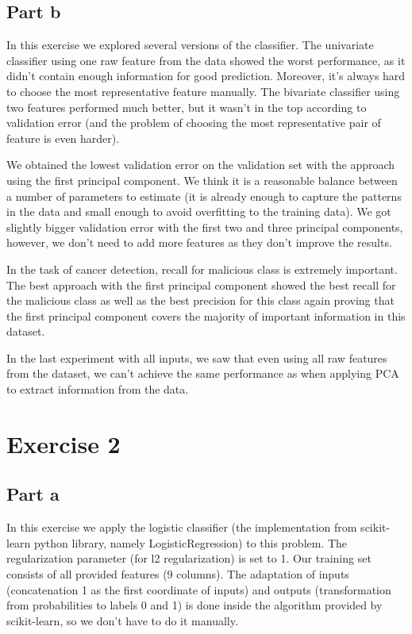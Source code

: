 \documentclass[11pt,a4paper]{article}
\begin{document}
\subsection*{Part b}
In this exercise we explored several versions of the classifier. The univariate classifier using one raw feature from the data showed the worst performance, as it didn't contain enough information for good prediction. Moreover, it's always hard to choose the most representative feature manually. The bivariate classifier using two features performed much better, but it wasn't in the top according to validation error (and the problem of choosing the most representative pair of feature is even harder).

We obtained the lowest validation error on the validation set with the approach using the first principal component. We think it is a reasonable balance between a number of parameters to estimate (it is already enough to capture the patterns in the data and small enough to avoid overfitting to the training data). We got slightly bigger validation error with the first two and three principal components, however, we don't need to add more features as they don't improve the results.

In the task of cancer detection, recall for malicious class is extremely important. The best approach with the first principal component showed the best recall for the malicious class as well as the best precision for this class again proving that the first principal component covers the majority of important information in this dataset.

In the last experiment with all inputs, we saw that even using all raw features from the dataset, we can't achieve the same performance as when applying PCA to extract information from the data.

\section*{Exercise 2}
\subsection*{Part a}

In this exercise we apply the logistic classifier (the implementation from scikit-learn python library, namely LogisticRegression) to this problem. The regularization parameter (for l2 regularization) is set to 1.  Our training set consists of all provided features (9 columns). The adaptation of inputs (concatenation 1 as the first coordinate of inputs) and outputs (transformation from probabilities to labels 0 and 1) is done inside the algorithm provided by scikit-learn, so we don't have to do it manually.
 
\end{document}
